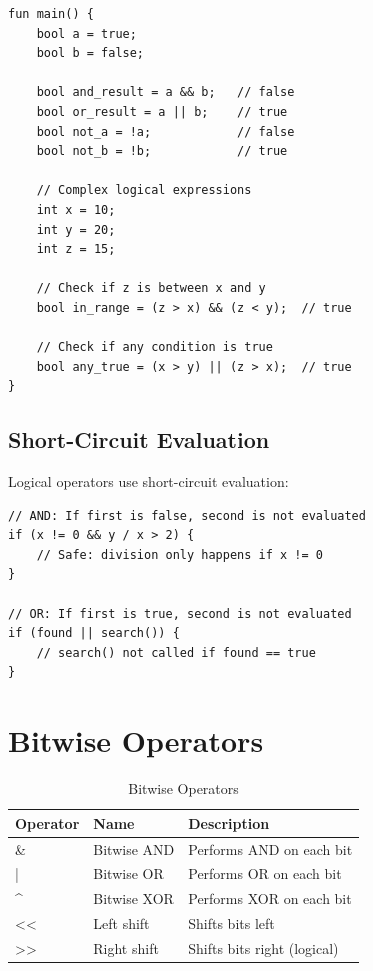 \documentclass[12pt,a4paper,oneside]{book}
\begin{document}
\begin{lstlisting}[style=algo, caption={Logical Operations}]
fun main() {
    bool a = true;
    bool b = false;
    
    bool and_result = a && b;   // false
    bool or_result = a || b;    // true
    bool not_a = !a;            // false
    bool not_b = !b;            // true
    
    // Complex logical expressions
    int x = 10;
    int y = 20;
    int z = 15;
    
    // Check if z is between x and y
    bool in_range = (z > x) && (z < y);  // true
    
    // Check if any condition is true
    bool any_true = (x > y) || (z > x);  // true
}
\end{lstlisting}

\subsection{Short-Circuit Evaluation}

Logical operators use short-circuit evaluation:

\begin{lstlisting}[style=algo]
// AND: If first is false, second is not evaluated
if (x != 0 && y / x > 2) {
    // Safe: division only happens if x != 0
}

// OR: If first is true, second is not evaluated
if (found || search()) {
    // search() not called if found == true
}
\end{lstlisting}

\section{Bitwise Operators}

\begin{table}[H]
\centering
\caption{Bitwise Operators}
\begin{tabularx}{\textwidth}{|l|l|X|}
\hline
\textbf{Operator} & \textbf{Name} & \textbf{Description} \\
\hline
\& & Bitwise AND & Performs AND on each bit \\
| & Bitwise OR & Performs OR on each bit \\
\^{} & Bitwise XOR & Performs XOR on each bit \\
<< & Left shift & Shifts bits left \\
>> & Right shift & Shifts bits right (logical) \\
\hline
\end{tabularx}
\end{table}
\end{document}
